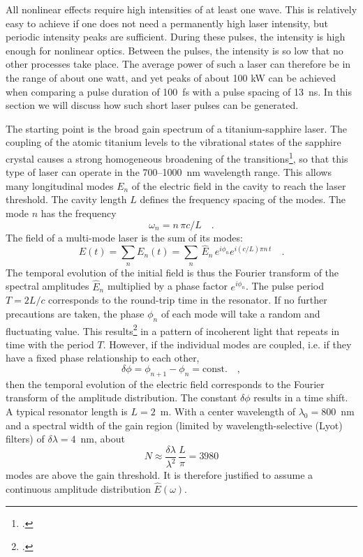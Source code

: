 All nonlinear effects require high intensities of at least one wave. This is relatively easy to achieve if one does not need a permanently high laser intensity, but periodic intensity peaks are sufficient. During these pulses, the intensity is high enough for nonlinear optics. Between the pulses, the intensity is so low that no other processes take place. The average power of such a laser can therefore be in the range of about one watt, and yet peaks of about 100 kW can be achieved when comparing a pulse duration of 100~fs with a pulse spacing of 13~ns. In this section we will discuss how such short laser pulses can be generated.


The starting point is the broad gain spectrum of a titanium-sapphire laser. The coupling of the atomic titanium levels to the vibrational states of the sapphire crystal causes a strong homogeneous broadening of the transitions\footcite[chapter 4]{Rulliere2005}, so that this type of laser can operate in the 700--1000~nm wavelength range. This allows many longitudinal modes $E_n$ of the electric field in the cavity to reach the laser threshold. The cavity length $L$ defines the frequency spacing of the modes. The mode $n$ has the frequency 
\begin{equation}
 \omega_n = n \, \pi c / L \quad.
\end{equation}
The  field of a multi-mode laser is the sum of its modes:
\begin{equation}
  E(t) = \sum_n E_n(t) = \sum_n \, \hat{E}_n \, e^{i \phi_n} e^{i (c/L) \pi n \, t} \quad .
\end{equation}
The temporal evolution of the initial field is thus the Fourier transform of the spectral amplitudes $\hat{E}_n$ multiplied by a phase factor $e^{i \phi_n}$. The pulse period $T = 2L /c$ corresponds to the round-trip time in the resonator. If no further precautions are taken, the phase $\phi_n$ of each mode will take a random and fluctuating value. This results\footcite{DielsRudolph1996} in a pattern of incoherent light that repeats in time with the period $T$. However, if the individual modes are coupled, i.e. if they have a fixed phase relationship to each other,
\begin{equation}
   \delta \phi = \phi_{n+1} - \phi_n = \text{const.} \quad,
   \label{eq:fwm:gl_fwm_phiconst}
\end{equation}
then the temporal evolution of the electric field corresponds to the
Fourier transform of the amplitude distribution. The constant $\delta \phi$ results in a time shift. A typical resonator length is $L = 2$~m. With a center wavelength of $\lambda_0 = 800$~nm and a
spectral width of the gain region (limited by wavelength-selective (Lyot) filters) of $\delta \lambda = 4$~nm, about
\begin{equation}
 N \approx \frac{\delta \lambda}{ \lambda^2} \, \frac{L}{\pi} =
 3980
\end{equation}
modes are above the gain threshold. It is therefore justified to assume a continuous amplitude distribution $\hat{E}(\omega)$.

